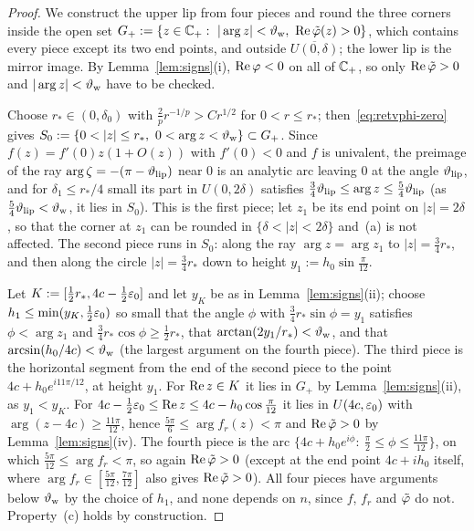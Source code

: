 \begin{proof}
We construct the upper lip from four pieces and round the three corners inside the open set
$G_+:=\{z\in\C_+:\ |\arg z|<\thw,\ \re\tvphi(z)>0\}$, which contains every piece except its two end points, and outside
$\overline{U(0,\delta)}$; the lower lip is the mirror image. By Lemma~\ref{lem:signs}(i), $\operatorname{Re}\varphi<0$ on all of $\mathbb{C}_+$, so only $\operatorname{Re}\tilde\varphi>0$ and
$|\arg z|<\vartheta_{\mathrm{w}}$ have to be checked.

Choose $r_*\in(0,\delta_0)$ with $\frac2pr^{-1/p}>Cr^{1/2}$ for $0<r\le r_*$; then~\eqref{eq:retvphi-zero} gives
$S_0:=\{0<|z|\le r_*,\ 0<\arg z<\thw\}\subset G_+$. Since $f(z)=f'(0)z(1+O(z))$ with $f'(0)<0$ and $f$ is univalent, the preimage of the ray
$\arg\zeta=-(\pi-\vartheta_{\mathrm{lip}})$ near $0$ is an analytic arc leaving $0$ at the angle $\vartheta_{\mathrm{lip}}$, and for $\delta_1\le r_*/4$ small
its part in $U(0,2\delta)$ satisfies $\frac34\vartheta_{\mathrm{lip}}\le\arg z\le\frac54\vartheta_{\mathrm{lip}}$ (as $\frac54\vartheta_{\mathrm{lip}}<\vartheta_{\mathrm{w}}$, it lies in $S_0$). This is
the first piece; let $z_1$ be its end point on $|z|=2\delta$, so that the corner at $z_1$ can be rounded in
$\{\delta<|z|<2\delta\}$ and~(a) is not affected. The second piece runs in $S_0$: along the ray $\arg z=\arg z_1$
to $|z|=\frac34r_*$, and then along the circle $|z|=\frac34r_*$ down to height $y_1:=h_0\sin\frac\pi{12}$.

Let $K:=[\frac12r_*,4c-\frac12\varepsilon_0]$ and let $y_K$ be as in Lemma~\ref{lem:signs}(ii); choose $h_1\le\min(y_K,\frac12\varepsilon_0)$
so small that the angle $\phi$ with $\frac34r_*\sin\phi=y_1$ satisfies $\phi<\arg z_1$ and
$\frac34r_*\cos\phi\ge\frac12r_*$, that $\arctan(2y_1/r_*)<\vartheta_{\mathrm{w}}$, and that $\arcsin(h_0/4c)<\vartheta_{\mathrm{w}}$ (the largest argument on the fourth piece). The third piece is the horizontal segment from the end of the second piece to the point
$4c+h_0e^{i11\pi/12}$, at height $y_1$. For $\operatorname{Re} z\in K$ it lies in $G_+$ by Lemma~\ref{lem:signs}(ii), as $y_1<y_K$. For
$4c-\frac12\varepsilon_0\le\operatorname{Re} z\le4c-h_0\cos\frac\pi{12}$ it lies in $U(4c,\varepsilon_0)$ with $\arg(z-4c)\ge\frac{11\pi}{12}$, hence
$\frac{5\pi}6\le\arg f_r(z)<\pi$ and $\operatorname{Re}\tilde\varphi>0$ by Lemma~\ref{lem:signs}(iv). The fourth piece is the arc
$\{4c+h_0e^{i\phi}:\ \frac\pi2\le\phi\le\frac{11\pi}{12}\}$, on which $\frac{5\pi}{12}\le\arg f_r<\pi$, so again
$\operatorname{Re}\tilde\varphi>0$ (except at the end point $4c+ih_0$ itself, where $\arg f_r\in[\frac{5\pi}{12},\frac{7\pi}{12}]$ also gives
$\operatorname{Re}\tilde\varphi>0$). All four pieces have arguments below $\vartheta_{\mathrm{w}}$ by the choice of $h_1$, and none depends on $n$, since $f$, $f_r$
and $\tilde\varphi$ do not. Property~(c) holds by construction.
\end{proof}

